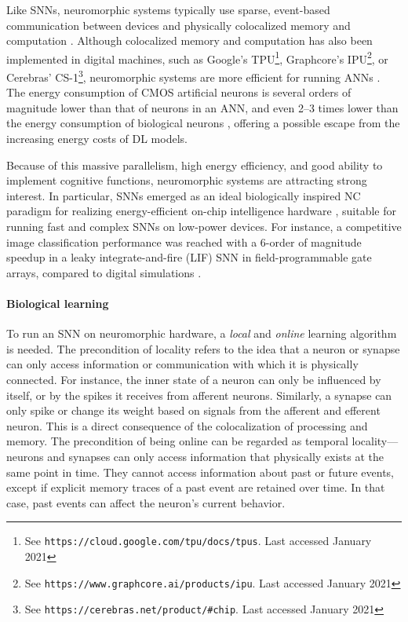 	Like SNNs, neuromorphic systems typically use sparse, event-based communication between devices
	and physically colocalized memory and computation \citep{sterling2015principles,neftci2018data}.
	Although colocalized memory and computation has also been implemented in digital machines, such as Google's TPU\footnote{See \texttt{https://cloud.google.com/tpu/docs/tpus}. Last accessed January 2021}, Graphcore's IPU\footnote{See \texttt{https://www.graphcore.ai/products/ipu}. Last accessed January 2021}, or Cerebras' CS-1\footnote{See \texttt{https://cerebras.net/product/\#chip}. Last accessed January 2021}, neuromorphic systems are more efficient for running ANNs \citep{merolla2014million,rajendran2019low}.
	The energy consumption of CMOS artificial neurons is several orders of magnitude lower than that of neurons in an ANN, and even 2--3 times lower than the energy consumption of biological neurons \citep{elbez2020progressive}, offering a possible escape from the increasing energy costs of DL models.

	Because of this massive parallelism, high energy efficiency, and good ability to implement cognitive functions, neuromorphic systems are attracting strong interest.
	In particular, SNNs emerged as an ideal biologically inspired NC paradigm for realizing energy-efficient on-chip intelligence hardware \citep{merolla2014million,davies2018loihi}, suitable for running fast and complex SNNs on low-power devices.
	For instance, a competitive image classification performance was reached with a 6-order of magnitude speedup in a leaky integrate-and-fire (LIF) SNN in field-programmable gate arrays, compared to digital simulations \citep{zhang2020low}.

\paragraph{Biological learning}
	To run an SNN on neuromorphic hardware, a \emph{local} and \emph{online} learning algorithm is needed.
	The precondition of locality refers to the idea that a neuron or synapse can only access information or communication with which it is physically connected.
	For instance, the inner state of a neuron can only be influenced by itself, or by the spikes it receives from afferent neurons.
	Similarly, a synapse can only spike or change its weight based on signals from the afferent and efferent neuron.
	This is a direct consequence of the colocalization of processing and memory.
	The precondition of being online can be regarded as temporal locality---neurons and synapses can only access information that physically exists at the same point in time.
	They cannot access information about past or future events, except if explicit memory traces of a past event are retained over time.
	In that case, past events can affect the neuron's current behavior.


